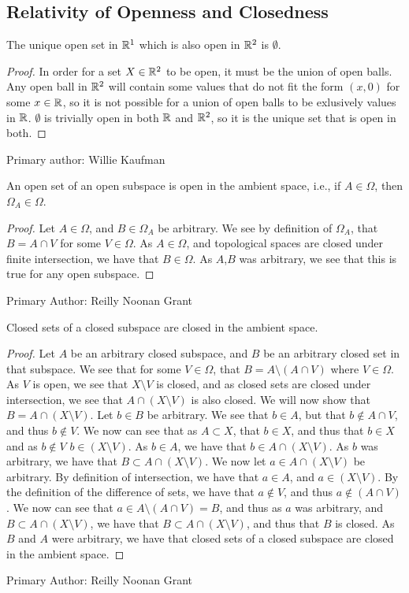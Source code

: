 \subsection{Relativity of Openness and Closedness}
\begin{majorEx}%
The unique open set in $\mathbb{R}^1$ which is also open in $\mathbb{R}^2$ is $\emptyset$.
\end{majorEx}
\begin{proof}
In order for a set $X \in \mathbb{R}^2$ to be open, it must be the union of open balls. Any open ball in $\mathbb{R}^2$ will contain some values that do not fit the form $(x, 0)$ for some $x \in \mathbb{R}$, so it is not possible for a union of open balls to be exlusively values in $\mathbb{R}$. $\emptyset$ is trivially open in both $\mathbb{R}$ and $\mathbb{R}^2$, so it is the unique set that is open in both. 
\end{proof}

Primary author: Willie Kaufman

\begin{majorEx}%
An open set of an open subspace is open in the ambient space, i.e., if $A \in \Omega$, then $\Omega_A \in \Omega$.
\end{majorEx}
\begin{proof}
  Let $A\in \Omega$, and $B \in \Omega_A$ be arbitrary. We see by
  definition of 
  $\Omega_A$, that $B = A \cap V$ for some $V\in \Omega$. As $A\in
  \Omega$, and topological spaces are closed under finite
  intersection, we have that $B \in \Omega$. As $A$,$B$ was arbitrary, we
  see that this is true for any open subspace.
\end{proof}
Primary Author: Reilly Noonan Grant
\begin{majorEx}%
Closed sets of a closed subspace are closed in the ambient space.
\end{majorEx}
\begin{proof}
  Let $A$ be an arbitrary closed subspace, and $B$ be an arbitrary
  closed set in that subspace. We see that for some $V\in \Omega$,
  that $B= A \setminus (A\cap V)$ where $V \in \Omega$. As $V$ is
  open, we see that $X \setminus V$ is closed, and as closed sets are
  closed under intersection, we see that $A \cap (X \setminus V)$ is
  also closed. We will now show that $B =A \cap (X \setminus V)$. Let
  $b\in B$ be arbitrary. We see that $b\in A$, but that $b \notin
  A \cap V$, and thus $b \notin V$. We now can see that as $A\subset
  X$, that $b\in X$, and thus that $b\in X$ and as $b\notin V$ $b\in
  (X\setminus V)$. As $b \in A$, we have that $b\in A \cap (X\setminus
  V)$. As $b$ was arbitrary, we have that $B \subset A \cap (X \setminus V)$.
  We now let  $a\in A \cap (X \setminus V)$ be arbitrary. By
  definition of intersection, we have that $a \in A$, and 
  $a \in  (X \setminus V)$. By the definition of the difference of
  sets, we have that $a \notin V$, and thus  $a \notin (A\cap V)$. We
  now can see that $a \in A \setminus (A\cap V) = B$, and thus as $a$
  was arbitrary, and $B \subset A \cap (X \setminus V)$, we have that
  $B \subset A \cap (X \setminus V)$, and thus that $B$ is closed. As
  $B$ and $A$ were arbitrary, we have that closed sets of a closed
  subspace are closed in the ambient space. 
\end{proof}
Primary Author: Reilly Noonan Grant

